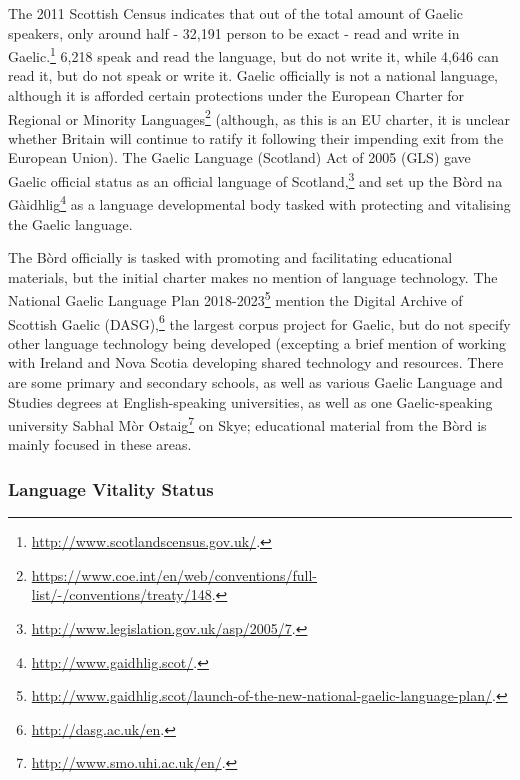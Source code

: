 The 2011 Scottish Census indicates that out of the total amount of Gaelic speakers, only around half - 32,191 person to be exact - read and write in Gaelic.\footnote{\href{http://www.scotlandscensus.gov.uk/}{http://www.scotlandscensus.gov.uk/}. } 6,218 speak and read the language, but do not write it, while 4,646 can read it, but do not speak or write it. Gaelic officially is not a national language, although it is afforded certain protections under the European Charter for Regional or Minority Languages\footnote{\href{https://www.coe.int/en/web/conventions/full-list/-/conventions/treaty/148}{https://www.coe.int/en/web/conventions/full-list/-/conventions/treaty/148}. } (although, as this is an EU charter, it is unclear whether Britain will continue to ratify it following their impending exit from the European Union). The Gaelic Language (Scotland) Act of 2005 (GLS) gave Gaelic official status as an official language of Scotland,\footnote{\href{http://www.legislation.gov.uk/asp/2005/7}{http://www.legislation.gov.uk/asp/2005/7}. } and set up the B\`ord na G\`aidhlig\footnote{\href{http://www.gaidhlig.scot/}{http://www.gaidhlig.scot/}. } as a language developmental body tasked with protecting and vitalising the Gaelic language.

The B\`ord officially is tasked with promoting and facilitating educational materials, but the initial charter makes no mention of language technology. The National Gaelic Language Plan 2018-2023\footnote{\href{http://www.gaidhlig.scot/launch-of-the-new-national-gaelic-language-plan/}{http://www.gaidhlig.scot/launch-of-the-new-national-gaelic-language-plan/}. } \citep{bord2018national} mention the Digital Archive of Scottish Gaelic (DASG),\footnote{\href{http://dasg.ac.uk/en}{http://dasg.ac.uk/en}. } the largest corpus project for Gaelic, but do not specify other language technology being developed (excepting a brief mention of working with Ireland and Nova Scotia developing shared technology and resources. There are some primary and secondary schools, as well as various Gaelic Language and Studies degrees at English-speaking universities, as well as one Gaelic-speaking university Sabhal M\`or Ostaig\footnote{\href{http://www.smo.uhi.ac.uk/en/}{http://www.smo.uhi.ac.uk/en/}. } on Skye; educational material from the B\`ord is mainly focused in these areas.

\subsubsection{Language Vitality Status}

